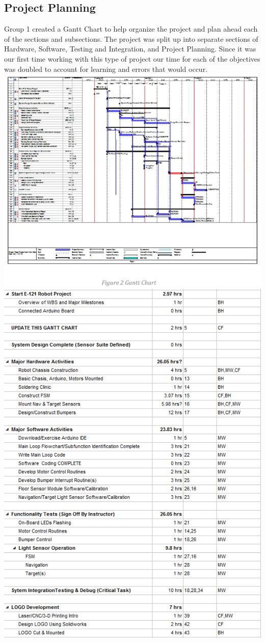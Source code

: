 \documentclass{article}
\begin{document}
\subsection{Project Planning}
Group 1 created a Gantt Chart to help organize the project and plan ahead each of the sections and subsections. The project was split up into separate sections of Hardware, Software, Testing and Integration, and Project Planning. Since it was our first time working with this type of project our time for each of the objectives was doubled to account for learning and errors that would occur.\\
\includegraphics[width=\textwidth]{Gantt_Chart.png}
\includegraphics[width=\textwidth]{GanttChartBreakdown.png}
\end{document}
